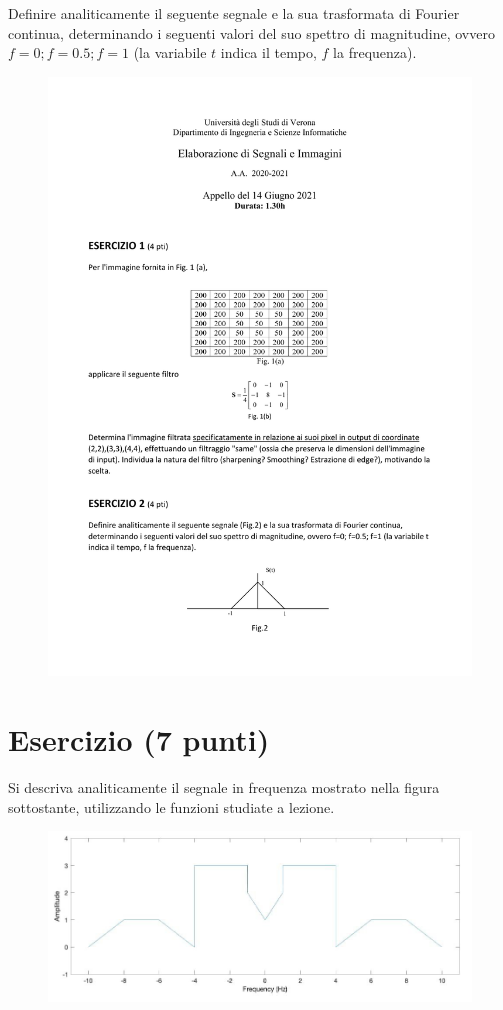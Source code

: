 \documentclass[a4paper]{article}
\begin{document}
	Definire analiticamente il seguente segnale e la sua trasformata di Fourier continua, determinando i seguenti valori del suo spettro di magnitudine, ovvero $f=0; f=0.5; f=1$ (la variabile $t$ indica il tempo, $f$ la frequenza).
	\begin{figure}[!htp]
		\centering
		\includegraphics[width=.65\textwidth]{img/fig_1.pdf}
	\end{figure}\newpage

	\section{Esercizio (7 punti)}
	
	Si descriva analiticamente il segnale in frequenza mostrato nella figura sottostante, utilizzando le funzioni studiate a lezione.
	\begin{figure}[!htp]
		\centering
		\includegraphics[width=\textwidth]{img/fig_2.png}
	\end{figure}
\end{document}
